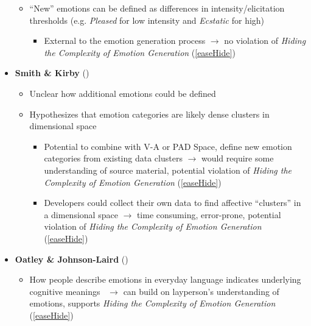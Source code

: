 \begin{itemize}
\begin{itemize}
        \item ``New'' emotions can be defined as differences in
        intensity/elicitation thresholds (e.g. \textit{Pleased} for low
        intensity and \textit{Ecstatic} for high)~\citep[p.~185]{occ}
        \begin{itemize}
            \item External to the emotion generation process $\rightarrow$ no
            violation of \textit{Hiding the Complexity of Emotion Generation}
            (\ref{easeHide})
        \end{itemize}
    \end{itemize}

    \item \textbf{Smith \& Kirby} (\weak)
    \begin{itemize}
        \item Unclear how additional emotions could be defined

        \item Hypothesizes that emotion categories are likely dense clusters in
        dimensional space~\citep[p.~245--246]{smith_scott_mandler_1997}
        \begin{itemize}
            \item Potential to combine with V-A or PAD Space, define new
            emotion categories from existing data clusters $\rightarrow$ would
            require some understanding of source material, potential violation
            of \textit{Hiding the Complexity of Emotion Generation}
            (\ref{easeHide})

            \item Developers could collect their own data to find affective
            ``clusters'' in a dimensional space $\rightarrow$ time consuming,
            error-prone, potential violation of \textit{Hiding the Complexity
                of Emotion Generation} (\ref{easeHide})
        \end{itemize}
    \end{itemize}

    \item \textbf{Oatley \& Johnson-Laird} (\strong)
    \begin{itemize}
        \item How people describe emotions in everyday language indicates
        underlying cognitive meanings~\citep[p.~210]{johnson1992basic}
        $\rightarrow$ can build on layperson's understanding of emotions,
        supports \textit{Hiding the Complexity of Emotion Generation}
        (\ref{easeHide})


\end{itemize}
\end{itemize}
